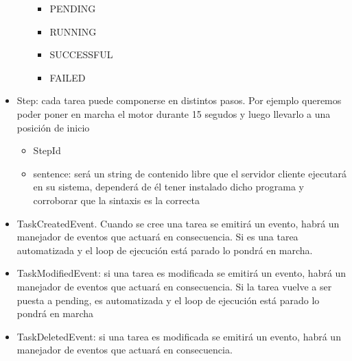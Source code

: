 \begin{itemize}
\begin{itemize}
\begin{itemize}
                \item PENDING
                \item RUNNING
                \item SUCCESSFUL
                \item FAILED
            \end{itemize}
    \end{itemize}
    \item Step: cada tarea puede componerse en distintos pasos. Por ejemplo queremos poder poner en marcha el motor durante 15 segudos y luego llevarlo a una posición de inicio
    \begin{itemize}
      \item StepId
      \item sentence: será un string de contenido libre que el servidor cliente ejecutará en su sistema, dependerá de él tener instalado dicho programa y corroborar que la sintaxis es la correcta
    \end{itemize}
    \item TaskCreatedEvent. Cuando se cree una tarea se emitirá un evento, habrá un manejador de eventos que actuará en consecuencia. Si es una tarea automatizada y el loop de ejecución está parado lo pondrá en marcha.
    \item TaskModifiedEvent: si una tarea es modificada se emitirá un evento, habrá un manejador de eventos que actuará en consecuencia. Si la tarea vuelve a ser puesta a pending, es automatizada y el loop de ejecución está parado lo pondrá en marcha
    \item TaskDeletedEvent: si una tarea es modificada se emitirá un evento, habrá un manejador de eventos que actuará en consecuencia.
\end{itemize}

